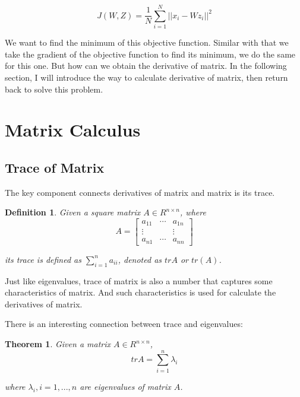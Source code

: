 \documentclass[a4paper]{book}
\newtheorem{theorem}{Theorem}[section]
\newtheorem{definition}{Definition}[section]
\begin{document}
  \begin{equation}
    J(W, Z) = \frac{1}{N} \sum\limits^{N}_{i=1}||x_{i} -
    Wz_{i}||^{2}
  \end{equation}

  We want to find the minimum of this objective function. Similar with
  that we take the gradient of the objective function to find its
  minimum, we do the same for this one. But how can we obtain the
  derivative of matrix. In the following section, I will introduce the
  way to calculate derivative of matrix, then return back to solve this
  problem.

  \section{Matrix Calculus}

    \subsection{Trace of Matrix}

    The key component connects derivatives of matrix and matrix is its
    trace.

    \begin{definition}
      Given a square matrix $A \in R^{n \times n}$, where
      \begin{displaymath}
        A = 
        \begin{bmatrix}
          a_{11}    & \cdots  & a_{1n} \\
            \vdots  &         & \vdots \\
          a_{n1}    & \cdots  & a_{nn} 
        \end{bmatrix}
      \end{displaymath}
      
      its trace is defined as $\sum\limits^{n}_{i=1}a_{ii}$, denoted as $trA$ or
      $tr(A)$.
    \end{definition}

    Just like eigenvalues, trace of matrix is also a number that captures
    some characteristics of matrix. And such characteristics is used for
    calculate the derivatives of matrix.

    There is an interesting connection between trace and eigenvalues:

    \begin{theorem}
      Given a matrix $A \in R^{n \times n}$,
      \begin{displaymath}
        trA = \sum\limits^{n}_{i=1}\lambda_{i}
      \end{displaymath}

      where $\lambda_{i}, i = 1, ..., n$ are eigenvalues of matrix $A$.
    \end{theorem}
\end{document}
